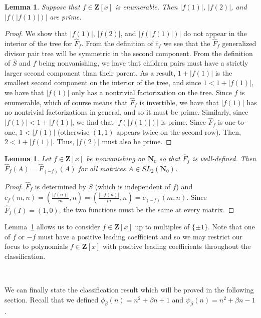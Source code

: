 \documentclass{article}
\newtheorem{lemma}[theorem]{Lemma}  %
\begin{document}
\begin{lemma}\label{f(1), f(2) prime}
Suppose that $f \in \mathbf{Z}[x]$ is enumerable. Then $|f(1)|$, $|f(2)|$, and $|f(|f(1)|)|$ are prime.
\end{lemma}

\begin{proof}
We show that $|f(1)|$, $|f(2)|$, and $|f(|f(1)|)|$ do not appear in the interior of the tree for $\hat{F}_f$. From the definition of $\bar{c}_f$ we see that the $\hat{F}_f$ generalized divisor pair tree will be symmetric in the second component. From the definition of $\bar{S}$ and $f$ being nonvanishing, we have that children pairs must have a strictly larger second component than their parent. As a result, $1 + |f(1)|$ is the smallest second component on the interior of the tree, and since $1 < 1 + |f(1)|$, we have that $|f(1)|$ only has a nontrivial factorization on the tree. Since $f$ is enumerable, which of course means that $\hat{F}_f$ is invertible, we have that $|f(1)|$ has no nontrivial factorizations in general, and so it must be prime. Similarly, since $|f(1)| < 1 + |f(1)|$, we find that $|f(|f(1)|)|$ is prime. Since $\hat{F}_f$ is one-to-one, $ 1 < |f(1)|$ (otherwise $(1,1)$ appears twice on the second row). Then, $2 < 1 + |f(1)|$. Thus, $|f(2)|$ must also be prime.
\end{proof}

\begin{lemma}\label{f -f lemma}
Let $f \in \mathbf{Z}[x]$ be nonvanishing on $\mathbf{N}_0$ so that $\hat{F}_f$ is well-defined. Then $\hat{F}_f(A) = \hat{F}_{(-f)}(A)$ for all matrices $A \in SL_2(\mathbf{N}_0)$.
\end{lemma}

\begin{proof}
$\hat{F}_f$ is determined by $\bar{S}$ (which is independent of $f$) and $\bar{c}_f(m,n) = (\frac{|f(n)|}{m}, n) = (\frac{|-f(n)|}{m}, n) = \bar{c}_{(-f)}(m,n)$. Since $\hat{F}_f(I) = (1,0)$, the two functions must be the same at every matrix.
\end{proof}

Lemma~\ref{f -f lemma} allows us to consider $f \in \mathbf{Z}[x]$ up to multiples of $\{\pm 1\}$. Note that one of $f$ or $-f$ must have a positive leading coefficient and so we may restrict our focus to polynomials $f \in \mathbf{Z}[x]$ with positive leading coefficients throughout the classification.

\

We can finally state the classification result which will be proved in the following section. Recall that we defined $\phi_\beta(n) = n^2 + \beta n + 1$ and $\psi_\beta(n) = n^2 + \beta n - 1$.
\end{document}
